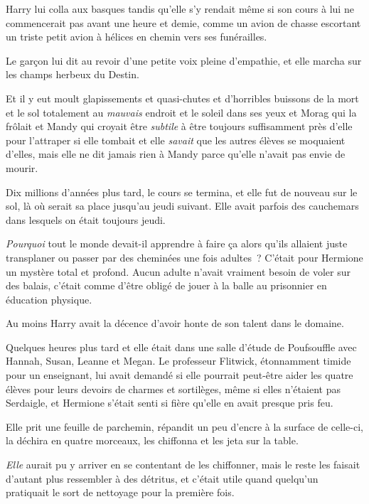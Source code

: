 Harry lui colla aux basques tandis qu'elle s'y rendait même si son cours à lui ne commencerait pas avant une heure et demie, comme un avion de chasse escortant un triste petit avion à hélices en chemin vers ses funérailles.

Le garçon lui dit au revoir d'une petite voix pleine d'empathie, et elle marcha sur les champs herbeux du Destin.

Et il y eut moult glapissements et quasi-chutes et d'horribles buissons de la mort et le sol totalement au \emph{mauvais} endroit et le soleil dans ses yeux et Morag qui la frôlait et Mandy qui croyait être \emph{subtile} à être toujours suffisamment près d'elle pour l'attraper si elle tombait et elle \emph{savait} que les autres élèves se moquaient d'elles, mais elle ne dit jamais rien à Mandy parce qu'elle n'avait pas envie de mourir.

Dix millions d'années plus tard, le cours se termina, et elle fut de nouveau sur le sol, là où serait sa place jusqu'au jeudi suivant. Elle avait parfois des cauchemars dans lesquels on était toujours jeudi.

\emph{Pourquoi} tout le monde devait-il apprendre à faire ça alors qu'ils allaient juste transplaner ou passer par des cheminées une fois adultes~? C'était pour Hermione un mystère total et profond. Aucun adulte n'avait vraiment besoin de voler sur des balais, c'était comme d'être obligé de jouer à la balle au prisonnier en éducation physique.

Au moins Harry avait la décence d'avoir honte de son talent dans le domaine.

\later

Quelques heures plus tard et elle était dans une salle d'étude de Poufsouffle avec Hannah, Susan, Leanne et Megan. Le professeur Flitwick, étonnamment timide pour un enseignant, lui avait demandé si elle pourrait peut-être aider les quatre élèves pour leurs devoirs de charmes et sortilèges, même si elles n'étaient pas Serdaigle, et Hermione s'était senti si fière qu'elle en avait presque pris feu.

Elle prit une feuille de parchemin, répandit un peu d'encre à la surface de celle-ci, la déchira en quatre morceaux, les chiffonna et les jeta sur la table.

\emph{Elle} aurait pu y arriver en se contentant de les chiffonner, mais le reste les faisait d'autant plus ressembler à des détritus, et c'était utile quand quelqu'un pratiquait le sort de nettoyage pour la première fois.

